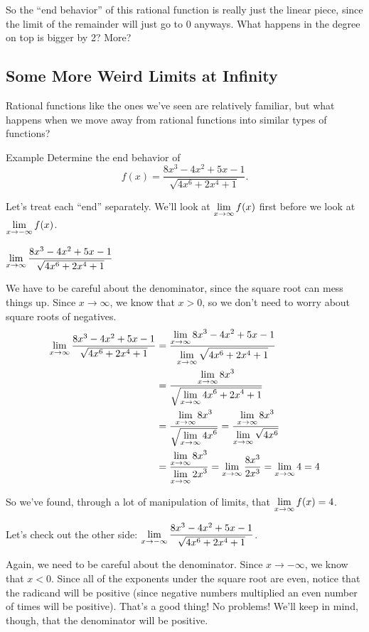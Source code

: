 So the ``end behavior'' of this rational function is really just the linear piece, since the limit of the remainder will just go to 0 anyways.
What happens in the degree on top is bigger by 2? More?

\subsection*{Some More Weird Limits at Infinity}

Rational functions like the ones we've seen are relatively familiar, but what happens when we move away from rational functions into similar types of functions?

\begin{note}{Example}
  Determine the end behavior of
  \[f(x) = \frac{8x^3-4x^2+5x-1}{\sqrt{4x^6+2x^4+1}}.\]

  Let's treat each ``end'' separately.
  We'll look at $\displaystyle \lim_{x\to\infty}f(x)$ first before we look at $\displaystyle \lim_{x\to-\infty}f(x)$.

  $\displaystyle \lim_{x\to\infty} \frac{8x^3-4x^2+5x-1}{\sqrt{4x^6+2x^4+1}}$

  We have to be careful about the denominator, since the square root can mess things up.
  Since $x\to\infty$, we know that $x>0$, so we don't need to worry about square roots of negatives.
  \begin{align*}
    \displaystyle \lim_{x\to\infty} \frac{8x^3-4x^2+5x-1}{\sqrt{4x^6+2x^4+1}}&= \frac{\displaystyle \lim_{x\to\infty}8x^3-4x^2+5x-1}{\displaystyle \lim_{x\to\infty}\sqrt{4x^6+2x^4+1}}\\
    & = \frac{\displaystyle \lim_{x\to\infty}8x^3}{\sqrt{\displaystyle \lim_{x\to\infty}4x^6+2x^4+1}}\\
    & =\dfrac{\displaystyle \lim_{x\to\infty}8x^3}{\sqrt{\displaystyle \lim_{x\to\infty}4x^6}} = \dfrac{\displaystyle \lim_{x\to\infty}8x^3}{\displaystyle \lim_{x\to\infty}\sqrt{4x^6}}\\
    & =  \dfrac{\displaystyle \lim_{x\to\infty}8x^3}{\displaystyle \lim_{x\to\infty}2x^3} = \displaystyle \lim_{x\to\infty} \dfrac{8x^3}{2x^3} = \displaystyle \lim_{x\to\infty} 4 = 4
  \end{align*}

  So we've found, through a lot of manipulation of limits, that $\displaystyle \lim_{x\to\infty} f(x) = 4$.

  Let's check out the other side: $\displaystyle \lim_{x\to-\infty} \frac{8x^3-4x^2+5x-1}{\sqrt{4x^6+2x^4+1}}$.

  Again, we need to be careful about the denominator.
  Since $x\to-\infty$, we know that $x<0$.
  Since all of the exponents under the square root are even, notice that the radicand will be positive (since negative numbers multiplied an even number of times will be positive).
  That's a good thing! No problems!
  We'll keep in mind, though, that the denominator will be positive.


\end{note}
